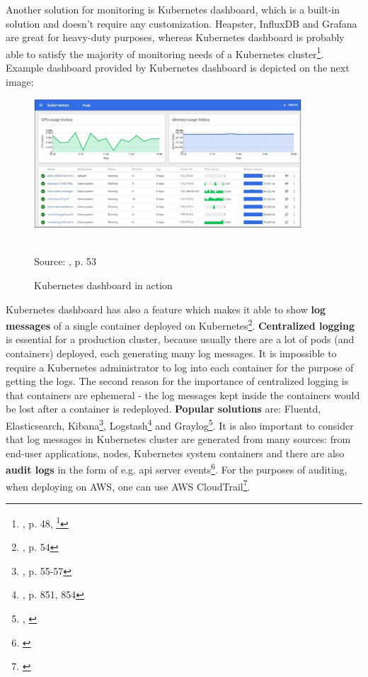 Another solution for monitoring is Kubernetes dashboard, which is a built-in solution and doesn't require any customization. Heapster, InfluxDB and Grafana are great for heavy-duty purposes, whereas Kubernetes dashboard is probably able to satisfy the majority of monitoring needs of a Kubernetes cluster\footnote{\cite{book-mastering-k8s}, p. 48, \footnote{\cite{book-devops-k8s}, p. 875, 879-882}}. Example dashboard provided by Kubernetes dashboard is depicted on the next image:
\begin{figure}[H]
  \centering
  \includegraphics[width=10cm]{figures/k8s-dashboard.png}
  \label{fig:grafana}
  \caption{Kubernetes dashboard in action}
  \\
  \small{Source: \cite{book-mastering-k8s}, p. 53}
\end{figure}

Kubernetes dashboard has also a feature which makes it able to show \textbf{log messages} of a single container deployed on Kubernetes\footnote{\cite{book-mastering-k8s}, p. 54}. \textbf{Centralized logging} is essential for a production cluster, because usually there are a lot of pods (and containers) deployed, each generating many log messages. It is impossible to require a Kubernetes administrator to log into each container for the purpose of getting the logs. The second reason for the importance of centralized logging is that containers are ephemeral - the log messages kept inside the containers would be lost after a container is redeployed. \textbf{Popular solutions} are: Fluentd, Elasticsearch, Kibana\footnote{\cite{book-mastering-k8s}, p. 55-57}, Logstash\footnote{\cite{book-devops-k8s}, p. 851, 854} and Graylog\footnote{\cite{online-prod-year-k8s}, \cite{online-graylog}}. It is also important to consider that log messages in Kubernetes cluster are generated from many sources: from end-user applications, nodes, Kubernetes system containers and there are also \textbf{audit logs} in the form of e.g. api server events\footnote{\cite{online-graylog-art}}. For the purposes of auditing, when deploying on AWS, one can use AWS CloudTrail\footnote{\cite{online-ct}}.

